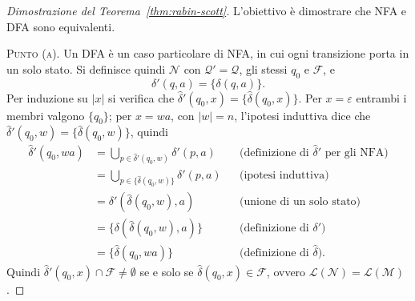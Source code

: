 \documentclass[a4paper, 11pt, oneside]{book}
\theoremstyle{formale}
\begin{document}
    \begin{proof}[Dimostrazione del Teorema~\ref{thm:rabin-scott}]
        L'obiettivo \`e dimostrare che NFA e DFA sono equivalenti.

        \textsc{Punto (a)}. Un DFA \`e un caso particolare di NFA, in cui ogni transizione
        porta in un solo stato. Si definisce quindi $\mathcal{N}$ con
        $\mathcal{Q}' = \mathcal{Q}$, gli stessi $q_0$ e $\mathcal{F}$, e
        \begin{equation*}
            \delta'(q, a) = \{\delta(q, a)\}.
        \end{equation*}
        Per induzione su $|x|$ si verifica che $\hat{\delta}'(q_0, x) =
        \{\hat{\delta}(q_0, x)\}$. Per $x = \varepsilon$ entrambi i membri valgono $\{q_0\}$;
        per $x = wa$, con $|w| = n$, l'ipotesi induttiva dice che
        $\hat{\delta}'(q_0, w) = \{\hat{\delta}(q_0, w)\}$, quindi
        \begin{align*}
            \hat{\delta}'(q_0, wa)
                &= \bigcup_{p \in \hat{\delta}'(q_0, w)} \delta'(p, a)
                    && \text{(definizione di $\hat{\delta}'$ per gli NFA)} \\
                &= \bigcup_{p \in \{\hat{\delta}(q_0, w)\}} \delta'(p, a)
                    && \text{(ipotesi induttiva)} \\
                &= \delta'(\hat{\delta}(q_0, w), a)
                    && \text{(unione di un solo stato)} \\
                &= \{\delta(\hat{\delta}(q_0, w), a)\}
                    && \text{(definizione di $\delta'$)} \\
                &= \{\hat{\delta}(q_0, wa)\}
                    && \text{(definizione di $\hat{\delta}$)}.
        \end{align*}
        Quindi $\hat{\delta}'(q_0, x) \cap \mathcal{F} \neq \emptyset$ se e solo se
        $\hat{\delta}(q_0, x) \in \mathcal{F}$, ovvero $\mathcal{L}(\mathcal{N}) =
        \mathcal{L}(\mathcal{M})$.


\end{proof}
\end{document}
